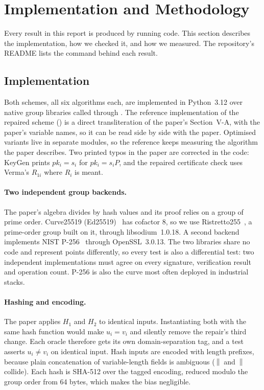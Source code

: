 \section{Implementation and Methodology}\label{sec:method}

Every result in this report is produced by running code. This section describes the implementation, how
we checked it, and how we measured. The repository's README lists the command behind each result.

\subsection{Implementation}
Both schemes, all six algorithms each, are implemented in Python~3.12 over native group libraries called
through . The reference implementation of the repaired scheme () is a direct
transliteration of the paper's Section~V-A, with the paper's variable names, so it can be read side by
side with the paper. Optimised variants live in separate modules, so the reference keeps measuring the
algorithm the paper describes. Two printed typos in the paper are corrected in the code: \textsf{KeyGen} prints $pk_i=s_i$ for
$pk_i=s_iP$, and the repaired certificate check uses Verma's $R_{1i}$ where $R_i$ is meant.

\paragraph{Two independent group backends.} 
The paper's algebra divides by hash values and its proof relies on a group of prime order. Curve25519
(Ed25519)~\cite{bernstein2012} has cofactor 8, so we use Ristretto255~\cite{rfc9496}, a prime-order group
built on it, through libsodium~1.0.18. A second backend implements NIST P-256~\cite{fips186} through
OpenSSL~3.0.13. The two libraries share no code and represent points differently, so every test is also a
differential test: two independent implementations must agree on every signature, verification result
and operation count. P-256 is also the curve most often deployed in industrial stacks.

\paragraph{Hashing and encoding.} 
The paper applies $H_1$ and $H_2$ to identical inputs. Instantiating both with the same hash function
would make $u_i=v_i$ and silently remove the repair's third change. Each oracle therefore gets its own
domain-separation tag, and a test asserts $u_i\neq v_i$ on identical input. Hash inputs are encoded with
length prefixes, because plain concatenation of variable-length fields is ambiguous
($\,\|\,$ and $\,\|\,$ collide). Each hash is SHA-512 over the
tagged encoding, reduced modulo the group order from 64 bytes, which makes the bias negligible.

